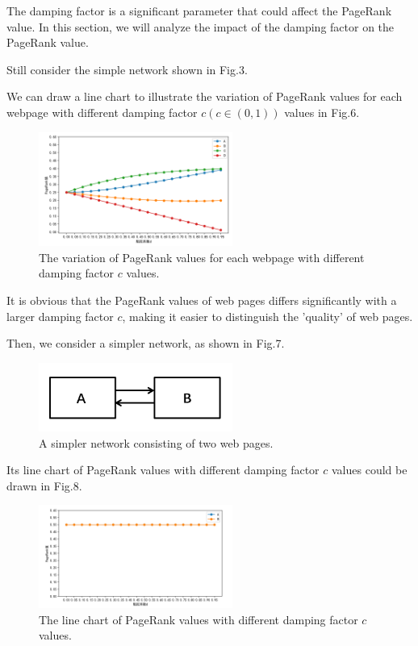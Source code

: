 \documentclass[lettersize,journal,12pt,conference]{IEEEtran}
\begin{document}
The damping factor is a significant parameter that could affect the PageRank value. In this section, we will analyze the impact of the damping factor on the PageRank value.

Still consider the simple network shown in Fig.3.

We can draw a line chart to illustrate the variation of PageRank values for each webpage with different damping factor $c (c \in (0,1))$ values in Fig.6.

\begin{figure}[h]
	\centering
	\includegraphics[width=2.5in]{images/fig8.png}
	\caption{The variation of PageRank values for each webpage with different damping factor $c$ values.}
	\label{fig8}
\end{figure}

It is obvious that the PageRank values of web pages differs significantly with a larger damping factor $c$, making it easier to distinguish the 'quality' of web pages.

Then, we consider a simpler network, as shown in Fig.7.

\begin{figure}[h]
	\centering
	\includegraphics[width=2.5in]{images/fig9.png}
	\caption{A simpler network consisting of two web pages.}
	\label{fig9}
\end{figure}

Its line chart of PageRank values with different damping factor $c$ values could be drawn in Fig.8.

\begin{figure}[h]
	\centering
	\includegraphics[width=2.5in]{images/fig10.png}
	\caption{The line chart of PageRank values with different damping factor $c$ values.}
	\label{fig10}
\end{figure}
\end{document}

